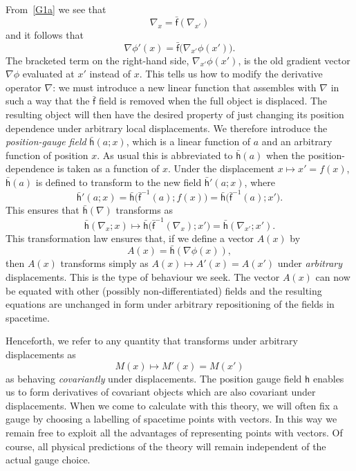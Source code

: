 \documentclass[a4paper]{article}
\numberwithin{equation}{section}
\newcommand{\eqv}{=}
\newcommand{\lbf}{\bar{\mathsf{f}}}
\newcommand{\lih}{\mathsf{h}}
\newcommand{\lbh}{\bar{\mathsf{h}}}
\newcommand{\ho}{\lbh}
\newcommand{\fo}{\lbf}
\newcommand{\grad}{\nabla}
\begin{document}
From~\eqref{G1a} we see that
%
\begin{equation}
\grad_x = \fo(\grad_{x'})
\end{equation}
%
and it follows that 
%
\begin{equation}
\grad \phi'(x) = \fo\bigl(\grad_{x'} \phi(x') \bigr).
\label{G1b}
\end{equation} 
%
The bracketed term on the right-hand side, $\grad_{x'} \phi(x')$, is
the old gradient vector $\grad\phi$ evaluated at $x'$ instead of $x$.
This tells us how to modify the derivative operator $\grad$: we must
introduce a new linear function that assembles with $\grad$ in such a
way that the $\fo$ field is removed when the full object is displaced.
The resulting object will then have the desired property of just
changing its position dependence under arbitrary local displacements.
We therefore introduce the \textit{position-gauge field} $\ho(a;x)$,
which is a linear function of $a$ and an arbitrary function of
position $x$.  As usual this is abbreviated to $\ho(a)$ when the
position-dependence is taken as a function of $x$.  Under the
displacement $x\mapsto x'=f(x)$, $\ho(a)$ is defined to transform to
the new field $\ho'(a;x)$, where
%
\begin{equation}
\ho'(a;x) \eqv \ho \bigl(\fo^{-1}(a); f(x) \bigr) =
\ho\bigl(\fo^{-1}(a); x' \bigr).
\label{G3}
\end{equation}
%
This ensures that $\ho(\grad)$ transforms as
%
\begin{equation}
\ho(\grad_x ; x) \mapsto \ho\bigl( \fo^{-1} (\grad_x); x'\bigr) =
\ho(\grad_{x'};x'). 
\end{equation}
%
This transformation law ensures that, if we define a vector $A(x)$ by
%
\begin{equation}
A(x) \eqv \ho(\grad \phi(x)),
\end{equation}
%
then $A(x)$ transforms simply as $A(x)\mapsto A'(x) = A(x')$ under {\em
arbitrary\/} displacements.  This is the type of behaviour we seek.
The vector $A(x)$ can now be equated with other (possibly
non-differentiated) fields and the resulting equations are unchanged
in form under arbitrary repositioning of the fields in spacetime.


Henceforth, we refer to any quantity that transforms under arbitrary
displacements as
%
\begin{equation}
M(x) \mapsto M'(x) = M(x')
\end{equation}
%
as behaving {\em covariantly\/} under displacements.  The position
gauge field $\lih$ enables us to form derivatives of covariant objects
which are also covariant under displacements.  When we come to
calculate with this theory, we will often fix a gauge by choosing a
labelling of spacetime points with vectors.  In this way we remain
free to exploit all the advantages of representing points with
vectors.  Of course, all physical predictions of the theory will
remain independent of the actual gauge choice.
\end{document}
